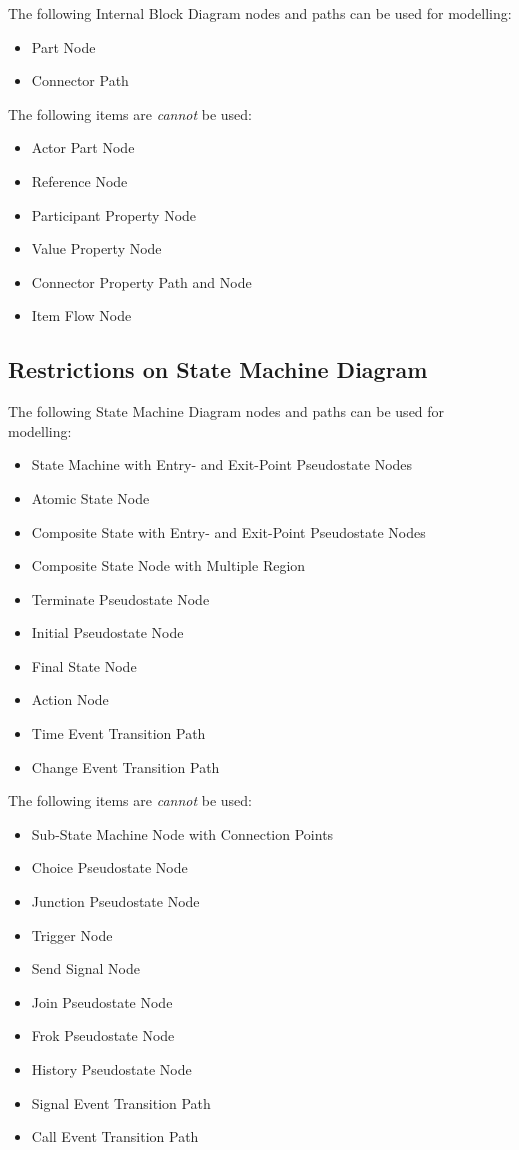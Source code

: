 The following Internal Block Diagram nodes and paths can be used for
modelling:
\begin{itemize}
\item Part Node
\item Connector Path
\end{itemize}

The following items are \emph{cannot} be used:
\begin{itemize}
\item Actor Part Node
\item Reference Node
\item Participant Property Node
\item Value Property Node
\item Connector Property Path and Node
\item Item Flow Node
\end{itemize}

\subsection{Restrictions on State Machine Diagram}

The following State Machine Diagram nodes and paths can be used for
modelling:
\begin{itemize}
\item State Machine with Entry- and Exit-Point Pseudostate Nodes
\item Atomic State Node
\item Composite State with Entry- and Exit-Point Pseudostate Nodes
\item Composite State Node with Multiple Region
\item Terminate Pseudostate Node
\item Initial Pseudostate Node
\item Final State Node
\item Action Node
\item Time Event Transition Path
\item Change Event Transition Path
\end{itemize}

The following items are \emph{cannot} be used:
\begin{itemize}
\item Sub-State Machine Node with Connection Points
\item Choice Pseudostate Node
\item Junction Pseudostate Node
\item Trigger Node
\item Send Signal Node
\item Join Pseudostate Node
\item Frok Pseudostate Node
\item History Pseudostate Node
\item Signal Event Transition Path
\item Call Event Transition Path
\end{itemize}

